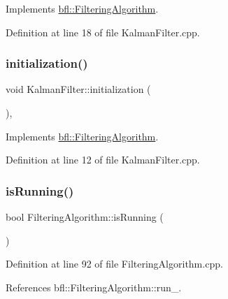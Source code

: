 Implements \mbox{\hyperlink{classbfl_1_1FilteringAlgorithm_acdfebf68405a427491e4dd9d020ae09b}{bfl\+::\+Filtering\+Algorithm}}.



Definition at line 18 of file Kalman\+Filter.\+cpp.

\mbox{\label{classbfl_1_1KalmanFilter_a34482fcfad20be0559cea9c060c5f949}} 
\subsubsection{\texorpdfstring{initialization()}{initialization()}}
{\footnotesize\ttfamily void Kalman\+Filter\+::initialization (\begin{DoxyParamCaption}{ }\end{DoxyParamCaption})\hspace{0.3cm}{\ttfamily [override]}, {\ttfamily [virtual]}}



Implements \mbox{\hyperlink{classbfl_1_1FilteringAlgorithm_af2a072aa51407fe5544bdbb7ce466e2a}{bfl\+::\+Filtering\+Algorithm}}.



Definition at line 12 of file Kalman\+Filter.\+cpp.

\mbox{\label{classbfl_1_1FilteringAlgorithm_a5cfecab2c778620e2557237472bb1721}} 
\subsubsection{\texorpdfstring{is\+Running()}{isRunning()}}
{\footnotesize\ttfamily bool Filtering\+Algorithm\+::is\+Running (\begin{DoxyParamCaption}{ }\end{DoxyParamCaption})\hspace{0.3cm}{\ttfamily [inherited]}}



Definition at line 92 of file Filtering\+Algorithm.\+cpp.



References bfl\+::\+Filtering\+Algorithm\+::run\+\_\+.

